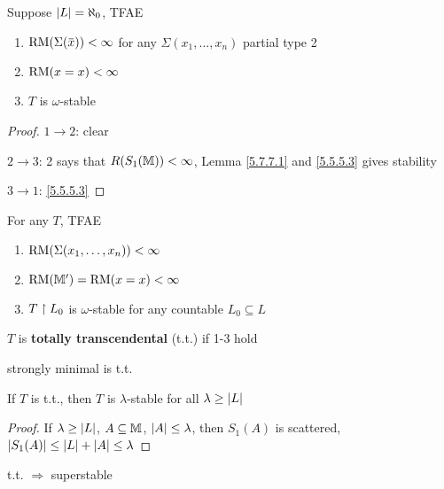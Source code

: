 \documentclass[11pt]{article}
\begin{document}
\begin{theorem}[]
Suppose \(\abs{L}=\aleph_0\), TFAE
\begin{enumerate}
\item \(\RM(\Sigma(\barx))<\infty\) for any \(\Sigma(x_1,\dots,x_n)\) partial type 2
\item \(\operatorname{RM}(x=x)<\infty\)
\item \(T\) is \(\omega\)-stable
\end{enumerate}
\end{theorem}

\begin{proof}
\(1\to 2\): clear

\(2\to 3\): 2 says that \(R(S_1(\mathbb{M}))<\infty\), Lemma \ref{5.7.7.1} and \ref{5.5.5.3} gives stability

\(3\to 1\): \ref{5.5.5.3}
\end{proof}

\begin{theorem}[]
For any \(T\), TFAE
\begin{enumerate}
\item \(\operatorname{RM}(\Sigma(x_1,\dots,x_n))<\infty\)
\item \(\operatorname{RM}(\mathbb{M}')=\operatorname{RM}(x=x)<\infty\)
\item \(T\upharpoonright L_0\) is \(\omega\)-stable  for any countable \(L_0\subseteq L\)
\end{enumerate}
\end{theorem}

\begin{definition}[]
\(T\) is \textbf{totally transcendental} (t.t.) if 1-3 hold
\end{definition}

\begin{examplle}[]
strongly minimal is t.t.
\end{examplle}

\begin{theorem}[]
If \(T\) is t.t., then \(T\) is \(\lambda\)-stable for all \(\lambda\ge\abs{L}\)
\end{theorem}

\begin{proof}
If \(\lambda\ge\abs{L}\), \(A\subseteq\mathbb{M}\), \(\abs{A}\le\lambda\), then \(S_1(A)\) is scattered, \(\abs{S_1(A)}\le\abs{L}+\abs{A}\le\lambda\)
\end{proof}

\begin{corollary}[]
t.t. \(\Rightarrow\) superstable
\end{corollary}
\end{document}
